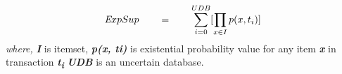 \begin{equation}\label{equation:exp_sup}
	\emph ExpSup \qquad = \qquad \sum_{i = 0}^{UDB} [\prod_{x \in I } p(x , t_i)]
	\end{equation}
\emph {where,}	\textbf{\emph {I}} is itemset,	\textbf{\emph { p(x, ti)}} is existential probability value for any item \textbf{\emph {x}} in transaction \textbf{\emph {t\textsubscript{i}}} 	\textbf{\emph {UDB}} is an uncertain database.\\